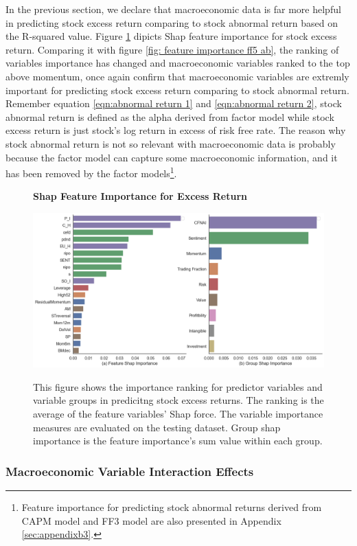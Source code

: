 In the previous section, we declare that macroeconomic data is far more helpful in predicting stock excess return comparing to stock abnormal return based on the R-squared value. Figure \ref{fig: feature importance ex} dipicts Shap feature importance for stock excess return. Comparing it with figure \ref{fig: feature importance ff5 ab}, the ranking of variables importance has changed and macroeconomic variables ranked to the top above momentum, once again confirm that macroeconomic variables are extremly important for predicting stock excess return comparing to stock abnormal return. Remember equation \ref{eqn:abnormal return 1} and \ref{eqn:abnormal return 2}, stock abnormal return is defined as the alpha derived from factor model while stock excess return is just stock's log return in excess of risk free rate. The reason why stock abnormal return is not so relevant with macroeconomic data is probably because the factor model can capture some macroeconomic information, and it has been removed by the factor models\footnote{Feature importance for predicting stock abnormal returns derived from CAPM model and FF3 model are also presented in Appendix \ref{sec:appendixb3}.}.

\begin{figure}[H]
  \centering
  \caption{\textbf{Shap Feature Importance for Excess Return}}
  \includegraphics[width=.8\textwidth]{images/shap_feature_importance_ex.png}
  \label{fig: feature importance ex}
  \caption*{\footnotesize{This figure shows the importance ranking for predictor variables and variable groups in predicitng stock excess returns. The ranking is the average of the feature variables' Shap force. The variable importance measures are evaluated on the testing dataset. Group shap importance is the feature importance's sum value within each group.}}
\end{figure}

\subsubsection{Macroeconomic Variable Interaction Effects}

